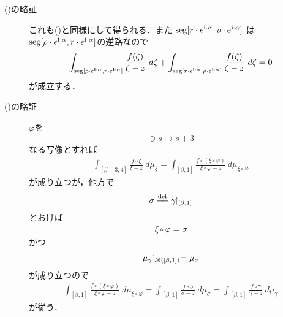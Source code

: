 \begin{description}
		\item[()の略証]
			これも()と同様にして得られる．また
			$\operatorname{seg}[r \cdot e^{\mathbf{i} \cdot \alpha},\rho \cdot e^{\mathbf{i} \cdot \alpha}]$
			は$\operatorname{seg}[\rho \cdot e^{\mathbf{i} \cdot \alpha},r \cdot e^{\mathbf{i} \cdot \alpha}]$の逆路なので
			\begin{align}
				\int_{\operatorname{seg}[\rho \cdot e^{\mathbf{i} \cdot \alpha},r \cdot e^{\mathbf{i} \cdot \alpha}]} \frac{f(\zeta)}{\zeta - z}\ d\zeta
				+ \int_{\operatorname{seg}[r \cdot e^{\mathbf{i} \cdot \alpha},\rho \cdot e^{\mathbf{i} \cdot \alpha}]} \frac{f(\zeta)}{\zeta - z}\ d\zeta 
				= 0
			\end{align}
			が成立する．
			
		\item[()の略証]
			$\varphi$を
			\begin{align}
				[\beta,1] \ni s \longmapsto s + 3
			\end{align}
			なる写像とすれば
			\begin{align}
				\int_{[\beta+3,4]} \frac{f \circ \xi}{\xi - z}\ d\mu_{\xi}
				= \int_{[\beta,1]} \frac{f \circ (\xi \circ \varphi)}{\xi \circ \varphi - z}\ d\mu_{\xi \circ \varphi}
			\end{align}
			が成り立つが，他方で
			\begin{align}
				\sigma \defeq \gamma \rest_{[\beta,1]}
			\end{align}
			とおけば
			\begin{align}
				\xi \circ \varphi = \sigma
			\end{align}
			かつ
			\begin{align}
				\mu_{\gamma} \hspace{-0.41em}\upharpoonright_{\mathscr{B}([\beta,1])} = \mu_{\sigma}
			\end{align}
			が成り立つので
			\begin{align}
				\int_{[\beta,1]} \frac{f \circ (\xi \circ \varphi)}{\xi \circ \varphi - z}\ d\mu_{\xi \circ \varphi}
				= \int_{[\beta,1]} \frac{f \circ \sigma}{\sigma - z}\ d\mu_{\sigma}
				= \int_{[\beta,1]} \frac{f \circ \gamma}{\gamma - z}\ d\mu_{\gamma}
			\end{align}
			が従う．
	\end{description}